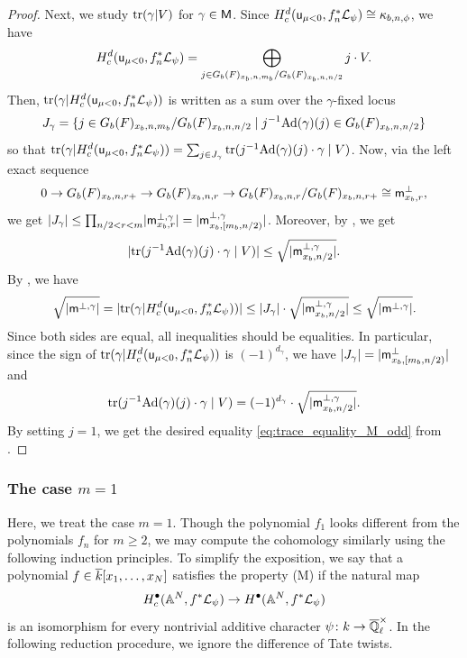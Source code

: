 \documentclass[12pt,reqno]{amsart}
\begin{document}
\begin{proof}
    Next, we study ${\operatorname{tr}}(\gamma \vert V)$ for $\gamma \in {\mathsf{M}}$. Since $H_c^d({\mathsf{u}}_{\mu < 0}, f_n^*{\mathcal{L}}_{\psi}) \cong \kappa_{b, n, \phi}$, we have 
    \[
        H_c^d({\mathsf{u}}_{\mu < 0}, f_n^*{\mathcal{L}}_{\psi}) = \bigoplus_{j \in G_b(F)_{x_b, n, m_b} / G_b(F)_{x_b, n, n/2}} j \cdot V. 
    \]
    Then, ${\operatorname{tr}}(\gamma\vert H_c^d({\mathsf{u}}_{\mu < 0}, f_n^*{\mathcal{L}}_{\psi}))$ is written as a sum over the $\gamma$-fixed locus 
    \[
        J_\gamma = \{ j \in G_b(F)_{x_b, n, m_b} / G_b(F)_{x_b, n, n/2} \mid j^{-1} {\operatorname{Ad}}(\gamma)(j) \in G_b(F)_{x_b, n, n/2} \}
    \]
    so that ${\operatorname{tr}}(\gamma\vert H_c^d({\mathsf{u}}_{\mu < 0}, f_n^*{\mathcal{L}}_{\psi})) = \sum_{j \in J_\gamma} {\operatorname{tr}}(j^{-1} {\operatorname{Ad}}(\gamma)(j) \cdot \gamma \mid V)$. Now, via the left exact sequence
    \[
        0 \to G_b(F)_{x_b, n, r+} \to G_b(F)_{x_b, n, r} \to G_b(F)_{x_b, n, r} / G_b(F)_{x_b, n, r+} \cong {\mathsf{m}}_{x_b, r}^\perp, 
    \]  
    we get $\lvert J_\gamma \rvert \leq \prod_{n/2 < r < m} \lvert {\mathsf{m}}_{x_b, r}^{\perp, \gamma} \rvert = \lvert {\mathsf{m}}^{\perp, \gamma}_{x_b, [m_b, n/2)} \rvert$. Moreover, by \cite[Theorem 2.27]{Tak26_Yu}, we get 
    \[
        \lvert {\operatorname{tr}}(j^{-1} {\operatorname{Ad}}(\gamma)(j) \cdot \gamma \mid V) \rvert \leq \sqrt{\lvert {\mathsf{m}}^{\perp, \gamma}_{x_b, n/2} \rvert}. 
    \]
    By , we have 
    \[
        \sqrt{\lvert {\mathsf{m}}^{\perp, \gamma} \rvert} = \lvert {\operatorname{tr}}(\gamma\vert H_c^d({\mathsf{u}}_{\mu < 0}, f_n^*{\mathcal{L}}_{\psi})) \rvert \leq \lvert J_\gamma \rvert \cdot \sqrt{\lvert {\mathsf{m}}^{\perp, \gamma}_{x_b, n/2} \rvert} \leq \sqrt{\lvert {\mathsf{m}}^{\perp, \gamma} \rvert}. 
    \]
    Since both sides are equal, all inequalities should be equalities. In particular, since the sign of ${\operatorname{tr}}(\gamma\vert H_c^d({\mathsf{u}}_{\mu < 0}, f_n^*{\mathcal{L}}_{\psi}))$ is $(-1)^{d_\gamma}$, we have $\lvert J_\gamma \rvert = \lvert {\mathsf{m}}^\perp_{x_b, [m_b, n/2)} \rvert$ and 
    \[
        {\operatorname{tr}}(j^{-1} {\operatorname{Ad}}(\gamma)(j) \cdot \gamma \mid V) = (-1)^{d_\gamma} \cdot \sqrt{\lvert {\mathsf{m}}^{\perp, \gamma}_{x_b, n/2} \rvert}. 
    \]
    By setting $j = 1$, we get the desired equality \eqref{eq:trace_equality_M_odd} from . 
\end{proof}

\subsubsection{The case $m = 1$}

Here, we treat the case $m = 1$. Though the polynomial $f_1$ looks different from the polynomials $f_n$ for $m \geq 2$, we may compute the cohomology similarly using the following induction principles. To simplify the exposition, we say that a polynomial $f \in {\overline{k}}[x_1, \ldots, x_N]$ satisfies the property (M) if the natural map 
\[
    H_c^\bullet(\mathbb{A}^N, f^* {\mathcal{L}}_\psi) \to H^\bullet(\mathbb{A}^N, f^* {\mathcal{L}}_\psi)
\]
is an isomorphism for every nontrivial additive character $\psi \colon k \to {\overline{\mathbb{Q}}_\ell^\times}$. In the following reduction procedure, we ignore the difference of Tate twists. 
\end{document}
